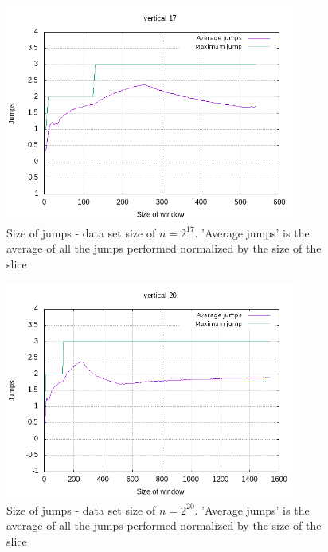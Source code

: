 \begin{figure}[h]
    \centering
    \includegraphics[width = 0.85\textwidth]{pictures/analysis/jump_vert_17.png}
    \caption{Size of jumps - data set size of $n=2^{17}$. 'Average jumps' is the average of all the jumps performed normalized by the size of the slice}\label{fig:jump_vert_17}
\end{figure}

\begin{figure}[h]
    \centering
    \includegraphics[width = 0.85\textwidth]{pictures/analysis/jump_vert_20.png}
    \caption{Size of jumps - data set size of $n=2^{20}$. 'Average jumps' is the average of all the jumps performed normalized by the size of the slice}\label{fig:jump_vert_20}
\end{figure}



